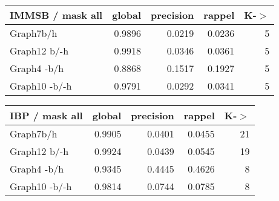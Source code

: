 



\begin{table*}[h]
\caption{K = 5}
	\begin{minipage}[h]{0.45\linewidth} 
\begin{tabular}{lrrrr}
\hline
 IMMSB / mask all   &   global &   precision &   rappel &    K-\ensuremath{>} \\
\hline
 Graph7b/h          &   0.9896 &      0.0219 &   0.0236 & 5 \\
 Graph12 b/-h       &   0.9918 &      0.0346 &   0.0361 & 5 \\
 Graph4 -b/h        &   0.8868 &      0.1517 &   0.1927 & 5 \\
 Graph10 -b/-h      &   0.9791 &      0.0292 &   0.0341 & 5 \\
\hline
\end{tabular}
\end{minipage}
\hspace{0.5cm}
\begin{minipage}[h]{0.45\linewidth}
\begin{tabular}{lrrrr}
\hline
 IBP / mask all   &   global &   precision &   rappel &     K-\ensuremath{>} \\
\hline
 Graph7b/h        &   0.9905 &      0.0401 &   0.0455 & 21 \\
 Graph12 b/-h     &   0.9924 &      0.0439 &   0.0545 & 19 \\
 Graph4 -b/h      &   0.9345 &      0.4445 &   0.4626 &  8 \\
 Graph10 -b/-h    &   0.9814 &      0.0744 &   0.0785 &  8 \\
\hline
\end{tabular}
\end{minipage}
\end{table*}


